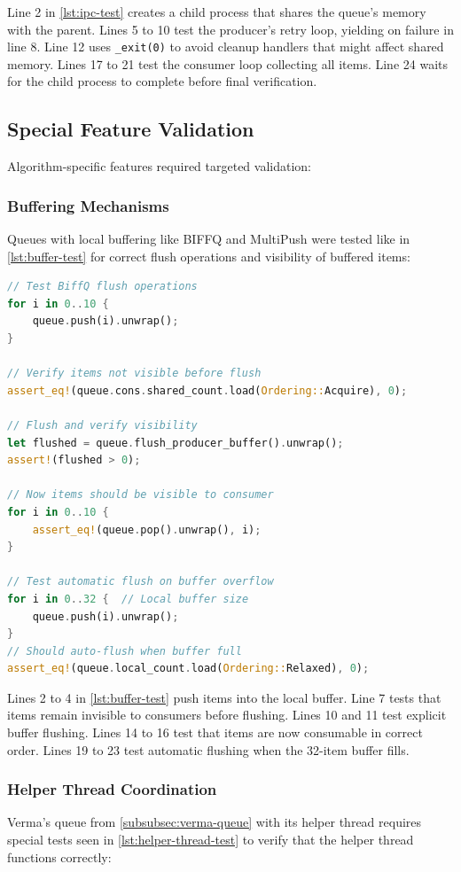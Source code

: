 Line 2 in \cref{lst:ipc-test} creates a child process that shares the queue's memory with the parent. Lines 5 to 10 test the producer's retry loop, yielding on failure in line 8. Line 12 uses \texttt{\_exit(0)} to avoid cleanup handlers that might affect shared memory. Lines 17 to 21 test the consumer loop collecting all items. Line 24 waits for the child process to complete before final verification.

\subsection{Special Feature Validation}
Algorithm-specific features required targeted validation:

\subsubsection{Buffering Mechanisms}
Queues with local buffering like \ac{BIFFQ} and MultiPush were tested like in \cref{lst:buffer-test} for correct flush operations and visibility of buffered items:

\begin{lstlisting}[language=Rust, style=boxed, caption={Buffer mechanism test}, label={lst:buffer-test}]
// Test BiffQ flush operations
for i in 0..10 {
    queue.push(i).unwrap();
}

// Verify items not visible before flush
assert_eq!(queue.cons.shared_count.load(Ordering::Acquire), 0);

// Flush and verify visibility
let flushed = queue.flush_producer_buffer().unwrap();
assert!(flushed > 0);

// Now items should be visible to consumer
for i in 0..10 {
    assert_eq!(queue.pop().unwrap(), i);
}

// Test automatic flush on buffer overflow
for i in 0..32 {  // Local buffer size
    queue.push(i).unwrap();
}
// Should auto-flush when buffer full
assert_eq!(queue.local_count.load(Ordering::Relaxed), 0);
\end{lstlisting}

Lines 2 to 4 in \cref{lst:buffer-test} push items into the local buffer. Line 7 tests that items remain invisible to consumers before flushing. Lines 10 and 11 test explicit buffer flushing. Lines 14 to 16 test that items are now consumable in correct order. Lines 19 to 23 test automatic flushing when the 32-item buffer fills.

\subsubsection{Helper Thread Coordination}
Verma's queue from \cref{subsubsec:verma-queue} with its helper thread requires special tests seen in \cref{lst:helper-thread-test} to verify that the helper thread functions correctly:

